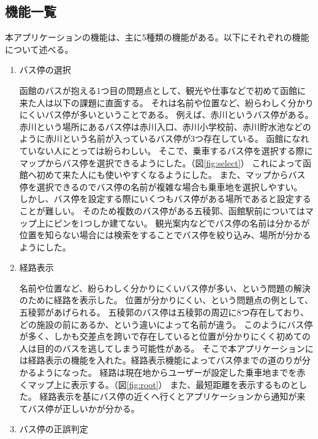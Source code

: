 \documentclass[openany,11pt,papersize]{jsbook}
\begin{document}
\subsection{機能一覧}
本アプリケーションの機能は、主に5種類の機能がある。以下にそれぞれの機能について述べる。
\begin{enumerate}

\item バス停の選択\mbox{}

函館のバスが抱える1つ目の問題点として、観光や仕事などで初めて函館に来た人は以下の課題に直面する。
それは名前や位置など、紛らわしく分かりにくいバス停が多いということである。
例えば、赤川というバス停がある。
赤川という場所にあるバス停は赤川入口、赤川小学校前、赤川貯水池などのように赤川という名前が入っているバス停が3つ存在している。
函館になれていない人にとっては紛らわしい。
そこで、乗車するバス停を選択する際にマップからバス停を選択できるようにした。（図\ref{fig:select}）
これによって函館へ初めて来た人にも使いやすくなるようにした。
また、マップからバス停を選択できるのでバス停の名前が複雑な場合も乗車地を選択しやすい。
しかし、バス停を設定する際にいくつもバス停がある場所であると設定することが難しい。
そのため複数のバス停がある五稜郭、函館駅前についてはマップ上にピンを1つしか建てない。
観光案内などでバス停の名前は分かるが位置を知らない場合には検索をすることでバス停を絞り込み、場所が分かるようにした。

\item 経路表示\mbox{}

名前や位置など、紛らわしく分かりにくいバス停が多い、という問題の解決のために経路を表示した。
位置が分かりにくい、という問題点の例として、五稜郭があげられる。
五稜郭のバス停は五稜郭の周辺に8つ存在しており、どの施設の前にあるか、という違いによって名前が違う。
このようにバス停が多く、しかも交差点を跨いで存在していると位置が分かりにくく初めての人は目的のバスを逃してしまう可能性がある。
そこで本アプリケーションには経路表示の機能を入れた。経路表示機能によってバス停までの道のりが分かるようになった。
経路は現在地からユーザーが設定した乗車地までを赤くマップ上に表示する。（図\ref{fig:root}）
また、最短距離を表示するものとした。
経路表示を基にバス停の近くへ行くとアプリケーションから通知が来てバス停が正しいかが分かる。

\item バス停の正誤判定\mbox{}


\end{enumerate}
\end{document}
